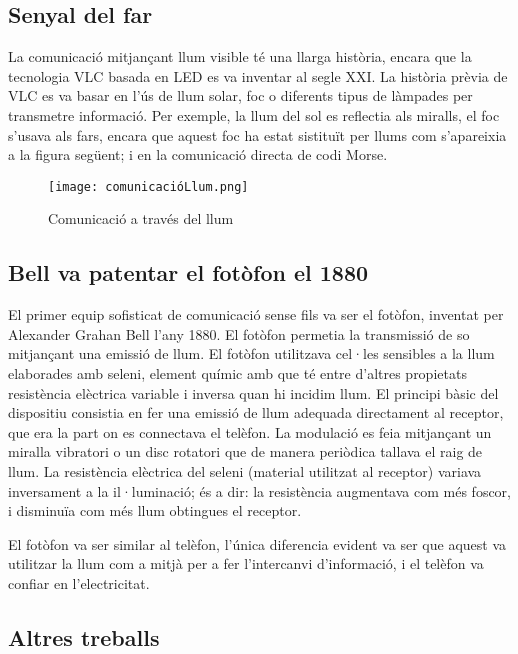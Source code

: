 \subsection*{Senyal del far}


La comunicació mitjançant llum visible té una llarga història, encara que la tecnologia VLC basada en LED es va inventar al segle XXI. La història prèvia de VLC es va basar en l'ús de llum solar, foc o diferents tipus de làmpades per transmetre informació. Per exemple, la llum del sol es reflectia als miralls, el foc s'usava als fars, encara que aquest foc ha estat sistituït per llums com s'apareixia a la figura següent; i en la comunicació directa de codi Morse.


\begin{figure}[h!]
    \centering
    \texttt{[image: comunicacióLlum.png]}
    \caption{Comunicació a través del llum}
\end{figure}

\subsection*{Bell va patentar el fotòfon el 1880}



El primer equip sofisticat de comunicació sense fils va ser el fotòfon, inventat per Alexander Grahan Bell l'any 1880.
El fotòfon permetia la transmissió de so mitjançant una emissió de llum. El fotòfon utilitzava cel·les sensibles a la llum elaborades amb seleni, element químic amb que té entre d'altres propietats resistència elèctrica variable i inversa quan hi incidim llum. El principi bàsic del dispositiu consistia en fer una emissió de llum adequada directament al receptor, que era la part on es connectava el telèfon. La modulació es feia mitjançant un miralla vibratori o un disc rotatori que de manera periòdica tallava el raig de llum. La resistència elèctrica del seleni (material utilitzat al receptor) variava inversament a la il·luminació; és a dir: la resistència augmentava com més foscor, i disminuïa com més llum obtingues el receptor.

El fotòfon va ser similar al telèfon, l'única diferencia evident va ser que aquest va utilitzar la llum com a mitjà per a fer l'intercanvi d'informació, i el telèfon va confiar en l'electricitat.


\subsection*{Altres treballs}

